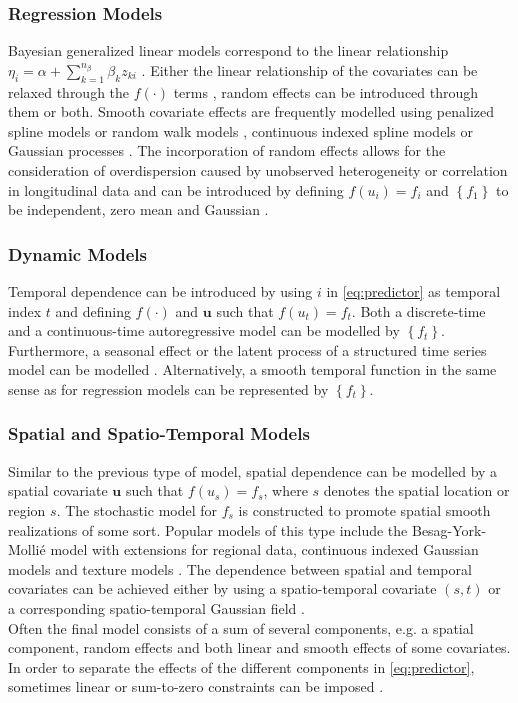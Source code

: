 \subsubsection{Regression Models}
Bayesian generalized linear models correspond to the linear relationship $\eta_i=\alpha+\sum_{k=1}^{n_\beta}\beta_k z_{ki}$ \autocite[][]{dey2000generalized}. Either the linear relationship of the covariates can be relaxed through the $f\left(\cdot\right)$ terms \autocite[][]{fahrmeir2013multivariate}, random effects can be introduced through them or both. Smooth covariate effects are frequently modelled using penalized spline models \autocite[][]{lang2004bayesian} or random walk models \autocite[][]{fahrmeir2013multivariate}, continuous indexed spline models \autocite[][]{rue2005gaussian} or Gaussian processes \autocite[][]{chu2005gaussian}. The incorporation of random effects allows for the consideration of overdispersion caused by unobserved heterogeneity or correlation in longitudinal data and can be introduced by defining $f\left(u_i\right)=f_i$ and $\left\lbrace f_1\right\rbrace$ to be independent, zero mean and Gaussian \autocite[][]{fahrmeir2001bayesian}.
\subsubsection{Dynamic Models}
Temporal dependence can be introduced by using $i$ in \eqref{eq:predictor} as temporal index $t$ and defining $f\left(\cdot\right)$ and $\pmb{u}$ such that $f\left(u_t\right)=f_t$. Both a discrete-time and a continuous-time autoregressive model can be modelled by $\left\lbrace f_t\right\rbrace$. Furthermore, a seasonal effect or the latent process of a structured time series model can be modelled \autocite[][]{kitagawa1996smoothness}. Alternatively, a smooth temporal function in the same sense as for regression models can be represented by $\left\lbrace f_t\right\rbrace$.
\subsubsection{Spatial and Spatio-Temporal Models}
Similar to the previous type of model, spatial dependence can be modelled by a spatial covariate $\pmb{u}$ such that $f\left(u_s\right)=f_s$, where $s$ denotes the spatial location or region $s$. The stochastic model for $f_s$ is constructed to promote spatial smooth realizations of some sort. Popular models of this type include the Besag-York-Mollié \autocite[][]{besag1991bayesian} model with extensions for regional data, continuous indexed Gaussian models \autocite[][]{banerjee2014hierarchical} and texture models \autocite[][]{marroquin2001gauss}. The dependence between spatial and temporal covariates can be achieved either by using a spatio-temporal covariate $(s,t)$ or a corresponding spatio-temporal Gaussian field \autocite[][]{kammann2003geoadditive}.\\
Often the final model consists of a sum of several components, e.g. a spatial component, random effects and both linear and smooth effects of some covariates. In order to separate the effects of the different components in \eqref{eq:predictor}, sometimes linear or sum-to-zero constraints can be imposed \autocite[][319--321]{rue2009approximate}.
